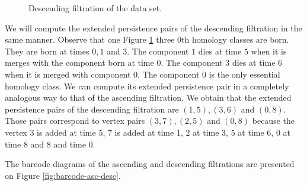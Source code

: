 \begin{figure}[h]
    \qquad \qquad

    \caption{Descending filtration of the data set.}%
    \label{fig:desc-filtration}%
\end{figure}

We will compute the extended persistence pairs of the descending filtration in the same manner. Observe that one Figure \ref{fig:desc-filtration} three 0th homology classes are born. They are born at times $0, 1$ and $3$. The component $1$ dies at time $5$ when it is merges with the component born at time $0$. The component $3$ dies at time $6$ when it is merged with component $0$. The component $0$ is the only essential homology class. We can compute its extended persistence pair in a completely analogous way to that of the ascending filtration. We obtain that the extended persistence pairs of the descending filtration are $(1, 5), (3, 6)$ and $(0, 8)$. Those pairs correspond to vertex pairs $(3, 7), (2, 5)$ and $(0, 8)$
because the vertex $3$ is added at time $5$, $7$ is added at time $1$, $2$ at time $3$, $5$ at time $6$, $0$ at time $8$ and $8$ and time $0$.

The barcode diagrams of the ascending and descending filtrations are presented on Figure \ref{fig:barcode-asc-desc}.

